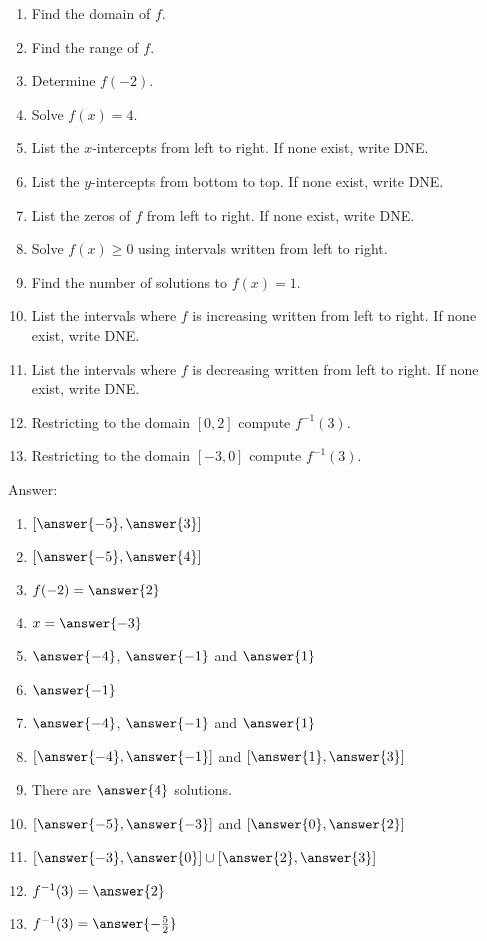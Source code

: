 \documentclass{ximera}
\begin{document}
\begin{exercise}
\begin{multicols}{2}
\begin{enumerate}
\item  Find the domain of $f$. \label{usefuncgraphfirst}
\item  Find the range of $f$.
\item  Determine $f(-2)$.
\item  Solve $f(x) = 4$.
\item  List the $x$-intercepts from left to right. If none exist, write DNE.
\item  List the $y$-intercepts from bottom to top. If none exist, write DNE.
\item  List the zeros of $f$ from left to right. If none exist, write DNE.
\item  Solve $f(x) \geq 0$ using intervals written from left to right.
\item  Find the number of solutions to $f(x) = 1$.
\item  List the intervals where $f$ is increasing written from left to right. If none exist, write DNE.
\item  List the intervals where $f$ is decreasing written from left to right. If none exist, write DNE.
\item  Restricting to the domain $[0,2]$ compute $f^{-1}(3)$.
\item  Restricting to the domain $[-3,0]$ compute $f^{-1}(3)$.
\end{enumerate}
\end{multicols}

Answer:

\begin{multicols}{2}
\begin{enumerate}
\item  $[\answer{-5},\answer{3}]$
\item  $[\answer{-5},\answer{4}]$
\item  $f(-2)=\answer{2}$
\item  $x=\answer{-3}$
\item  $\answer{-4}$, $\answer{-1}$ and $\answer{1}$
\item  $\answer{-1}$
\item  $\answer{-4}$, $\answer{-1}$ and $\answer{1}$
\item  $[\answer{-4},\answer{-1}]$ and $[\answer{1},\answer{3}]$
\item  There are $\answer{4}$ solutions.
\item  $[\answer{-5},\answer{-3}]$ and $[\answer{0},\answer{2}]$
\item  $[\answer{-3},\answer{0}]\cup[\answer{2},\answer{3}]$
\item  $f^{-1}(3)=\answer{2}$
\item  $f^{-1}(3)=\answer{-\frac{5}{2}}$
\end{enumerate}
\end{multicols}


\end{exercise}
\end{document}

